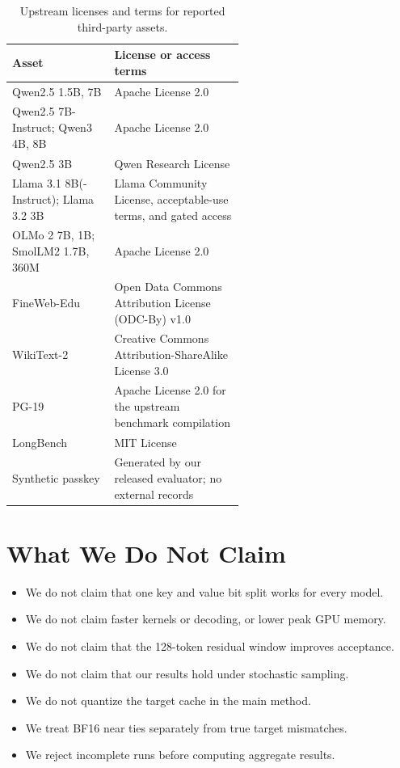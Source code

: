\documentclass{article}
\begin{document}
\begin{table}[ht]
  \centering
  \small
  \caption{Upstream licenses and terms for reported third-party assets.}
  \label{tab:app-assets}
  \begin{tabular}{lp{0.57\linewidth}}
    \toprule
    Asset & License or access terms \\
    \midrule
    Qwen2.5 1.5B, 7B & Apache License 2.0 \\
    Qwen2.5 7B-Instruct; Qwen3 4B, 8B & Apache License 2.0 \\
    Qwen2.5 3B & Qwen Research License \\
    Llama 3.1 8B(-Instruct); Llama 3.2 3B & Llama Community License,
      acceptable-use terms, and gated access \\
    OLMo 2 7B, 1B; SmolLM2 1.7B, 360M & Apache License 2.0 \\
    FineWeb-Edu & Open Data Commons Attribution License (ODC-By) v1.0 \\
    WikiText-2 & Creative Commons Attribution-ShareAlike License 3.0 \\
    PG-19 & Apache License 2.0 for the upstream benchmark compilation \\
    LongBench & MIT License \\
    Synthetic passkey & Generated by our released evaluator; no external records \\
    \bottomrule
  \end{tabular}
\end{table}
\FloatBarrier

\section{What We Do Not Claim}
\label{app:scope}

\begin{itemize}
  \item We do not claim that one key and value bit split works for every model.
  \item We do not claim faster kernels or decoding, or lower peak GPU memory.
  \item We do not claim that the 128-token residual window improves acceptance.
  \item We do not claim that our results hold under stochastic sampling.
  \item We do not quantize the target cache in the main method.
  \item We treat BF16 near ties separately from true target mismatches.
  \item We reject incomplete runs before computing aggregate results.
\end{itemize}

% 
\end{document}
